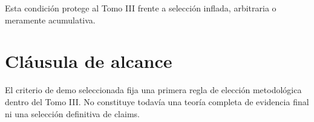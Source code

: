 \begin{observation}
Esta condición protege al Tomo III frente a selección inflada, arbitraria o meramente acumulativa.
\end{observation}

\section{Cláusula de alcance}
\begin{observation}
El criterio de demo seleccionada fija una primera regla de elección metodológica dentro del Tomo III. No constituye todavía una teoría completa de evidencia final ni una selección definitiva de claims.
\end{observation}

